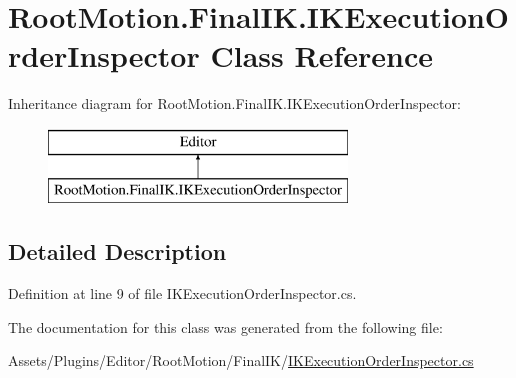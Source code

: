\hypertarget{class_root_motion_1_1_final_i_k_1_1_i_k_execution_order_inspector}{}\section{Root\+Motion.\+Final\+I\+K.\+I\+K\+Execution\+Order\+Inspector Class Reference}
\label{class_root_motion_1_1_final_i_k_1_1_i_k_execution_order_inspector}
Inheritance diagram for Root\+Motion.\+Final\+I\+K.\+I\+K\+Execution\+Order\+Inspector\+:\begin{figure}[H]
\begin{center}
\leavevmode
\includegraphics[height=2.000000cm]{class_root_motion_1_1_final_i_k_1_1_i_k_execution_order_inspector}
\end{center}
\end{figure}


\subsection{Detailed Description}


Definition at line 9 of file I\+K\+Execution\+Order\+Inspector.\+cs.



The documentation for this class was generated from the following file\+:\begin{DoxyCompactItemize}
\item 
Assets/\+Plugins/\+Editor/\+Root\+Motion/\+Final\+I\+K/\mbox{\hyperlink{_i_k_execution_order_inspector_8cs}{I\+K\+Execution\+Order\+Inspector.\+cs}}\end{DoxyCompactItemize}
